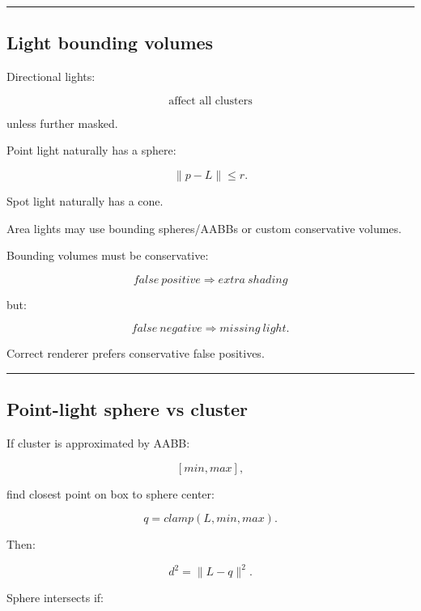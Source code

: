 \begin{center}\rule{0.5\linewidth}{0.5pt}\end{center}

\subsection{Light bounding volumes}\label{04-visual-computing-ii-ch040-light-bounding-volumes}

\hypertarget{04-visual-computing-ii-ch040-light-bounding-volumes}{}

Directional lights:

\[
\boxed{\text{affect all clusters}}
\]

unless further masked.

Point light naturally has a sphere:

\[
\|p-L\|\le r.
\]

Spot light naturally has a cone.

Area lights may use bounding spheres/AABBs or custom conservative volumes.

Bounding volumes must be conservative:

\[
\boxed{
false\ positive
\Rightarrow
extra\ shading
}
\]

but:

\[
\boxed{
false\ negative
\Rightarrow
missing\ light.
}
\]

Correct renderer prefers conservative false positives.

\begin{center}\rule{0.5\linewidth}{0.5pt}\end{center}

\subsection{Point-light sphere vs cluster}\label{04-visual-computing-ii-ch040-point-light-sphere-vs-cluster}

\hypertarget{04-visual-computing-ii-ch040-point-light-sphere-vs-cluster}{}

If cluster is approximated by AABB:

\[
[min,max],
\]

find closest point on box to sphere center:

\[
q=
clamp(
L,
min,
max
).
\]

Then:

\[
d^2=
\|L-q\|^2.
\]

Sphere intersects if:

